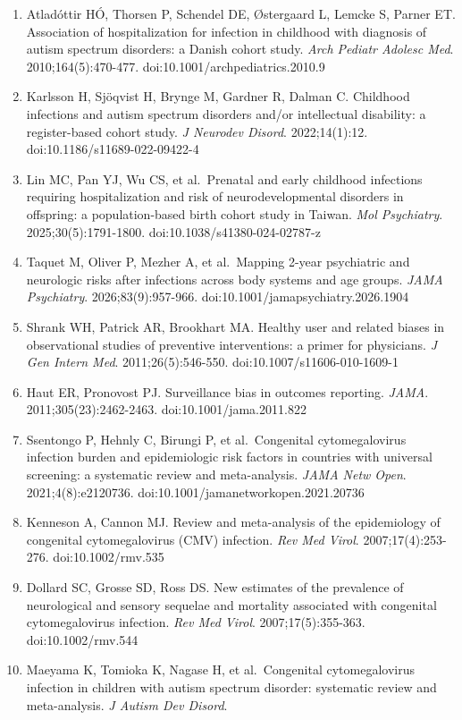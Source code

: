 \documentclass[11pt]{article}
\begin{document}
{\begin{enumerate}
\item
  Atladóttir HÓ, Thorsen P, Schendel DE, Østergaard L, Lemcke S, Parner ET. Association of hospitalization for infection in childhood with diagnosis of autism spectrum disorders: a Danish cohort
  study. \emph{Arch Pediatr Adolesc Med}. 2010;164(5):470-477. doi:10.1001/archpediatrics.2010.9
\item
  Karlsson H, Sjöqvist H, Brynge M, Gardner R, Dalman C. Childhood infections and autism spectrum disorders and/or intellectual disability: a register-based cohort study. \emph{J Neurodev Disord}.
  2022;14(1):12. doi:10.1186/s11689-022-09422-4
\item
  Lin MC, Pan YJ, Wu CS, et al.~Prenatal and early childhood infections requiring hospitalization and risk of neurodevelopmental disorders in offspring: a population-based birth cohort study in
  Taiwan. \emph{Mol Psychiatry}. 2025;30(5):1791-1800. doi:10.1038/s41380-024-02787-z
\item
  Taquet M, Oliver P, Mezher A, et al.~Mapping 2-year psychiatric and neurologic risks after infections across body systems and age groups. \emph{JAMA Psychiatry}. 2026;83(9):957-966.
  doi:10.1001/jamapsychiatry.2026.1904
\item
  Shrank WH, Patrick AR, Brookhart MA. Healthy user and related biases in observational studies of preventive interventions: a primer for physicians. \emph{J Gen Intern Med}. 2011;26(5):546-550.
  doi:10.1007/s11606-010-1609-1
\item
  Haut ER, Pronovost PJ. Surveillance bias in outcomes reporting. \emph{JAMA}. 2011;305(23):2462-2463. doi:10.1001/jama.2011.822
\item
  Ssentongo P, Hehnly C, Birungi P, et al.~Congenital cytomegalovirus infection burden and epidemiologic risk factors in countries with universal screening: a systematic review and meta-analysis.
  \emph{JAMA Netw Open}. 2021;4(8):e2120736. doi:10.1001/jamanetworkopen.2021.20736
\item
  Kenneson A, Cannon MJ. Review and meta-analysis of the epidemiology of congenital cytomegalovirus (CMV) infection. \emph{Rev Med Virol}. 2007;17(4):253-276. doi:10.1002/rmv.535
\item
  Dollard SC, Grosse SD, Ross DS. New estimates of the prevalence of neurological and sensory sequelae and mortality associated with congenital cytomegalovirus infection. \emph{Rev Med Virol}.
  2007;17(5):355-363. doi:10.1002/rmv.544
\item
  Maeyama K, Tomioka K, Nagase H, et al.~Congenital cytomegalovirus infection in children with autism spectrum disorder: systematic review and meta-analysis. \emph{J Autism Dev Disord}.

\end{enumerate}}
\end{document}
